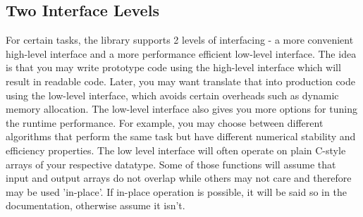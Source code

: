 
\subsection{Two Interface Levels}
For certain tasks, the library supports 2 levels of interfacing - a more convenient high-level interface and a more performance efficient low-level interface. The idea is that you may write prototype code using the high-level interface which will result in readable code. Later, you may want translate that into production code using the low-level interface, which avoids certain overheads such as dynamic memory allocation. The low-level interface also gives you more options for tuning the runtime performance. For example, you may choose between different algorithms that perform the same task but have different numerical stability and efficiency properties. The low level interface will often operate on plain C-style arrays of your respective datatype. Some of those functions will assume that input and output arrays do not overlap while others may not care and therefore may be used 'in-place'. If in-place operation is possible, it will be said so in the documentation, otherwise assume it isn't.


